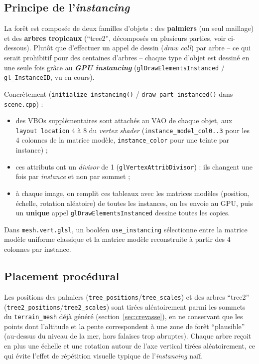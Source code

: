 \documentclass[11pt,a4paper]{article}
\begin{document}
\subsection{Principe de l'\emph{instancing}}

La forêt est composée de deux familles d'objets : des \textbf{palmiers}
(un seul maillage) et des \textbf{arbres tropicaux} (``tree2'',
décomposés en plusieurs parties, voir ci-dessous). Plutôt que
d'effectuer un appel de dessin (\emph{draw call}) par arbre -- ce qui
serait prohibitif pour des centaines d'arbres -- chaque type d'objet
est dessiné en une seule fois grâce au \textbf{\emph{GPU instancing}}
(\texttt{glDrawElementsInstanced} / \texttt{gl\_InstanceID}, vu en
cours).

Concrètement (\texttt{initialize\_instancing()} /
\texttt{draw\_part\_instanced()} dans \texttt{scene.cpp}) :
\begin{itemize}
    \item des VBOs supplémentaires sont attachés au VAO de chaque objet,
    aux \texttt{layout location} 4 à 8 du \emph{vertex shader}
    (\texttt{instance\_model\_col0..3} pour les 4 colonnes de la matrice
    modèle, \texttt{instance\_color} pour une teinte par instance) ;
    \item ces attributs ont un \emph{divisor} de 1
    (\texttt{glVertexAttribDivisor}) : ils changent une fois par
    \emph{instance} et non par sommet ;
    \item à chaque image, on remplit ces tableaux avec les matrices
    modèles (position, échelle, rotation aléatoire) de toutes les
    instances, on les envoie au GPU, puis un \textbf{unique} appel
    \texttt{glDrawElementsInstanced} dessine toutes les copies.
\end{itemize}

Dans \texttt{mesh.vert.glsl}, un booléen \texttt{use\_instancing}
sélectionne entre la matrice modèle uniforme classique et la matrice
modèle reconstruite à partir des 4 colonnes par instance.

\subsection{Placement procédural}

Les positions des palmiers (\texttt{tree\_positions}/\texttt{tree\_scales})
et des arbres ``tree2'' (\texttt{tree2\_positions}/\texttt{tree2\_scales})
sont tirées aléatoirement parmi les sommets du \texttt{terrain\_mesh}
déjà généré (section~\ref{sec:crevasse}), en ne conservant que les
points dont l'altitude et la pente correspondent à une zone de forêt
``plausible'' (au-dessus du niveau de la mer, hors falaises trop
abruptes). Chaque arbre reçoit en plus une échelle et une rotation
autour de l'axe vertical tirées aléatoirement, ce qui évite l'effet de
répétition visuelle typique de l'\emph{instancing} naïf.
\end{document}
